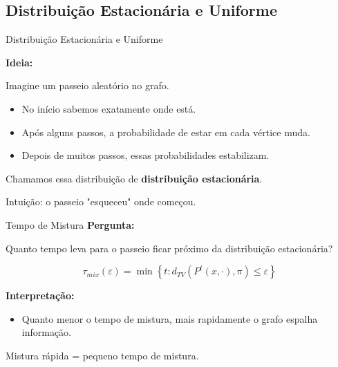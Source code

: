 \subsection{Distribuição Estacionária e Uniforme}
\begin{frame}{Distribuição Estacionária e Uniforme}


    \textbf{Ideia:}

    \bigskip

    Imagine um passeio aleatório no grafo.

    \begin{itemize}
        \item No início sabemos exatamente onde está.
        \item Após alguns passos, a probabilidade de estar em cada vértice muda.
        \item Depois de muitos passos, essas probabilidades estabilizam.
    \end{itemize}

    Chamamos essa distribuição de
    \textbf{distribuição estacionária}.

    \bigskip

    \alert{Intuição: o passeio "esqueceu" onde começou.}
\end{frame}



\begin{frame}{Tempo de Mistura}
    \textbf{Pergunta:}

    \bigskip

    Quanto tempo leva para o passeio ficar próximo da
    distribuição estacionária?

    \bigskip

    \[
        \tau_{mix}(\varepsilon)
        =
        \min
        \left\{
            t :
            d_{TV}\!\left(P^t(x,\cdot),\pi\right)
            \le \varepsilon
        \right\}
    \]

    \bigskip

    \textbf{Interpretação:}

    \begin{itemize}
        \item Quanto menor o tempo de mistura,
            mais rapidamente o grafo espalha informação.
    \end{itemize}

    \bigskip

    \alert{Mistura rápida = pequeno tempo de mistura.}
\end{frame}


